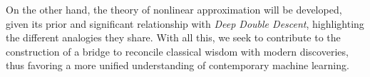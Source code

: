 On the other hand, the theory of nonlinear approximation will be developed, given its prior and significant relationship with \emph{Deep Double Descent}, highlighting the different analogies they share. With all this, we seek to contribute to the construction of a bridge to reconcile classical wisdom with modern discoveries, thus favoring a more unified understanding of contemporary machine learning.\newline

\clearpage
\thispagestyle{empty}
\mbox{}
\newpage
\endinput
